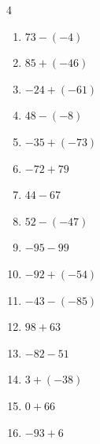 \begin{multicols}{4}
\begin{enumerate}
  \item $73-(-4)$

        \phantom{$=77$}

\columnbreak %

  \item $85+(-46)$

        \phantom{$=39$}

  \item $-24+(-61)$

        \phantom{$=-85$}

  \item $48-(-8)$

        \phantom{$=56$}

  \item $-35+(-73)$

        \phantom{$=-108$}

  \item $-72+79$

        \phantom{$=7$}

  \item $44-67$

        \phantom{$=-23$}

  \item $52-(-47)$

        \phantom{$=99$}

  \item $-95-99$

        \phantom{$=-194$}

  \item $-92+(-54)$

        \phantom{$=-146$}

  \item $-43-(-85)$

        \phantom{$=42$}

  \item $98+63$

        \phantom{$=161$}

  \item $-82-51$

        \phantom{$=-133$}

  \item $3+(-38)$

        \phantom{$=-35$}

  \item $0+66$

        \phantom{$=66$}

  \item $-93+6$


\end{enumerate}
\end{multicols}
